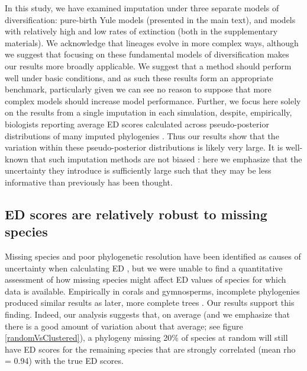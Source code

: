 \documentclass[10pt,english]{article}
\begin{document}
In this study, we have examined imputation under three separate models of
diversification: pure-birth Yule models (presented in the main text), and models
with relatively high and low rates of extinction (both in the supplementary
materials). We acknowledge that lineages evolve in more complex ways, although
we suggest that focusing on these fundamental models of diversification makes
our results more broadly applicable. We suggest that a method should perform
well under basic conditions, and as such these results form an appropriate
benchmark, particularly given we can see no reason to suppose that more complex
models should increase model performance. Further, we focus here solely on the
results from a single imputation in each simulation, despite, empirically,
biologists reporting average ED scores calculated across pseudo-posterior
distributions of many imputed phylogenies \autocite{Kuhn2011}. Thus our results
show that the variation within these pseudo-posterior distributions is likely
very large. It is well-known that such imputation methods are not biased
\autocite[indeed, this was originally shown by][]{Kuhn2011}: here we emphasize
that the uncertainty they introduce is sufficiently large such that they may be
less informative than previously has been thought.

\subsection*{ED scores are relatively robust to missing species}
Missing species and poor phylogenetic resolution have been identified as causes
of uncertainty when calculating ED \autocite{Isaac2007}, but we were unable to
find a quantitative assessment of how missing species might affect ED values of
species for which data is available. Empirically in corals and gymnosperms,
incomplete phylogenies produced similar results as later, more complete trees
\autocite{Curnick2015, Forest2018}. Our results support this finding. Indeed,
our analysis suggests that, on average (and we emphasize that there is a good
amount of variation about that average; see figure \ref{randomVsClustered}), a
phylogeny missing 20\% of species at random will still have ED scores for the
remaining species that are strongly correlated (mean rho = 0.94) with the true
ED scores.
\end{document}
